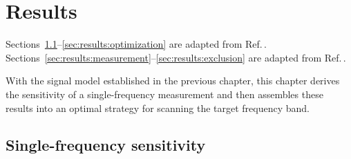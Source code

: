 \chapter{Results}\label{chap:results}
\begin{jointwork}
    Sections~\ref{sec:results:single}--\ref{sec:results:optimization} are adapted from Ref.\,\cite{Yuzhe2023_FrequencyScanning}. Sections~\ref{sec:results:measurement}--\ref{sec:results:exclusion} are adapted from Ref.\,\cite{Walter2024_LFthermal}.
\end{jointwork}

With the signal model established in the previous chapter, this chapter derives the sensitivity of a single-frequency measurement and then assembles these results into an optimal strategy for scanning the target frequency band.

\section{Single-frequency sensitivity}\label{sec:results:single}

